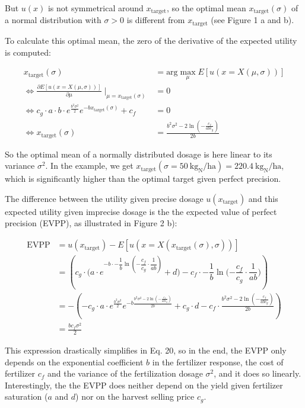 But $u(x)$ is not symmetrical around $x_\text{target}$, so the optimal mean $x_\text{target}(\sigma)$ of a normal distribution with $\sigma > 0$ is different from $x_\text{target}$ (see Figure 1 a and b).

To calculate this optimal mean, the zero of the derivative of the expected utility is computed:

\begin{align}
    x_\text{target}(\sigma) &= \text{arg}\max_{\mu} E[u(x=X(\mu, \sigma))] \\
    \iff \frac{\partial E[u(x=X(\mu, \sigma))]}{\partial \mu} \mid_{ \mu = x_\text{target}(\sigma)} &= 0 \\
    \iff  c_g \cdot a \cdot b \cdot e^{\frac{b^2 \sigma^2}{2}} e^{-b x_\text{target}(\sigma)} + c_f &= 0 \\
    \iff x_\text{target}(\sigma) &= \frac{b^2 \sigma^2 - 2 \ln\left(-\frac{c_f}{a b c_g}\right)}{2 b}
\end{align}

So the optimal mean of a normally distributed dosage is here linear to its variance $\sigma^2$. In the example, we get $x_\text{target}(\sigma = 50 \ \text{kg}_\text{N} / \text{ha}) = 220.4 \ \text{kg}_\text{N} / \text{ha}$, which is significantly higher than the optimal target given perfect precision.

The difference between the utility given precise dosage $u(x_\text{target})$ and this expected utility given imprecise dosage is the the expected value of perfect precision (EVPP), as illustrated in Figure 2 b):

\begin{align}
    \text{EVPP} &= u(x_\text{target}) - E[u(x=X(x_\text{target}(\sigma), \sigma))] \\
    &= \left(c_g \cdot \Biggl(a \cdot e^{-b \cdot -\dfrac{1}{b} \ln(-\dfrac{c_f}{c_g}\cdot\dfrac{1}{ab})} + d) - c_f
    \cdot -\dfrac{1}{b} \ln(-\dfrac{c_f}{c_g}\cdot\dfrac{1}{ab}\Biggr)\right) \\
    &= - \left(- c_g \cdot a \cdot e^{\frac{b^2 \sigma^2}{2}} e^{-b \frac{b^2 \sigma^2 - 2 \ln\left(-\frac{c_f}{a b
    c_g}\right)}{2 b}} + c_g \cdot d - c_f \cdot \frac{b^2 \sigma^2 - 2 \ln\left(-\frac{c_f}{a b c_g}\right)}{2 b}\right) \\
    &= \frac{b c_{f} \sigma^{2}}{2}
\end{align}

This expression drastically simplifies in Eq. 20, so in the end, the EVPP only depends on the exponential coefficient $b$ in the fertilizer response, the cost of fertilizer $c_f$ and the variance of the fertilization dosage $\sigma^2$, and it does so linearly. Interestingly, the the EVPP does neither depend on the yield given fertilizer saturation ($a$ and $d$) nor on the harvest selling price $c_g$.
